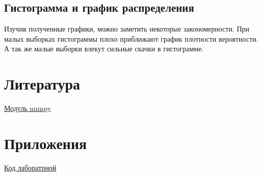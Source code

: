 \documentclass[a4]{article}
\begin{document}
		\subsection{Гистограмма и график распределения}
		Изучив полученные графики, можно заметить некоторые закономерности. При малых выборках гистограммы плохо приближают график плотности вероятности. А так же малые выборки влекут сильные скачки в гистограмме.
	
	\section{Литература}
	
	\href{https://numpy.org/doc/stable/}{Модуль numpy}
	
	\section{Приложения}
	
	\href{https://github.com/Sergey-Sharapov/MatStat_labs/lab1/lab1.py}{Код лаборатрной}
	
	
\end{document}
